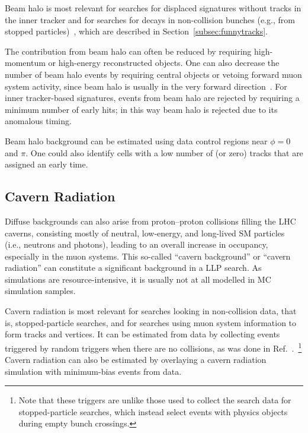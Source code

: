 Beam halo is most relevant for searches for displaced signatures without tracks in the inner tracker and for searches for decays in non-collision bunches (e.g., from stopped particles)~\cite{Khachatryan:2015jha, Chatrchyan:2012dxa, Khachatryan:2010uf}, which are described in Section~\ref{subsec:funnytracks}.

The contribution from beam halo can often be reduced by requiring high-momentum or high-energy reconstructed objects. One can also decrease the number of beam halo events by requiring central objects or vetoing forward muon system activity, since beam halo is usually in the very forward direction~\cite{Khachatryan:2015jha, Chatrchyan:2012dxa, Khachatryan:2010uf}. For inner tracker-based signatures, events from beam halo are rejected by requiring a minimum number of early hits; in this way beam halo is rejected due to its anomalous timing.

Beam halo background can be estimated using data control regions near $\phi=0$ and $\pi$. One could also identify cells with a low number of (or zero) tracks that are assigned an early time.

\subsection{Cavern Radiation}

Diffuse backgrounds can also arise from proton--proton collisions filling the LHC caverns, consisting mostly of neutral, low-energy, and long-lived SM particles (i.e., neutrons and photons), leading to an overall increase in occupancy, especially in the muon systems. This so-called ``cavern background'' or ``cavern radiation'' can constitute a significant background in a LLP search. As simulations are resource-intensive, it is usually not at all modelled in MC simulation samples.

Cavern radiation is most relevant for searches looking in non-collision data, that is, stopped-particle searches, and for searches using muon system information to form tracks and vertices. It can be estimated from data by collecting events triggered by random triggers when there are no collisions, as was done in Ref.~\cite{Aad:2013gva}.~\footnote{Note that these triggers are unlike those used to collect the search data for stopped-particle searches, which instead select events with physics objects during empty bunch crossings.} Cavern radiation can also be estimated by overlaying a cavern radiation simulation with minimum-bias events from data.

